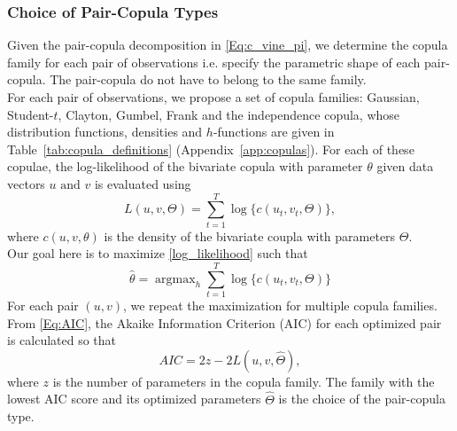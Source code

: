\documentclass[12pt,oneside,a4paper]{book}
\theoremstyle{definition}
\theoremstyle{remark}
\DeclareMathOperator*{\argmax}{argmax}
\begin{document}
				\subsubsection{Choice of Pair-Copula Types}
				Given the pair-copula decomposition in \ref{Eq:c_vine_pi}, we determine the copula family for each pair of observations i.e. specify the parametric shape of each pair-copula. The pair-copula do not have to belong to the same family.\\
				For each pair of observations, we propose a set of copula families: Gaussian, Student-$t$, Clayton, Gumbel, Frank and the independence copula, whose distribution functions, densities and $h$-functions are given in Table~\ref{tab:copula_definitions} (Appendix~\ref{app:copulas}). For each of these copulae, the log-likelihood of the bivariate copula with parameter $\theta$ given data vectors $u \text{ and } v$ is evaluated using
				\begin{equation}\label{log_likelihood}
					L\left(u, v,\Theta \right) = \sum_{t=1}^{T} \log \{c\left( u_t, v_t, \Theta \right)\},
				\end{equation}
				where $c\left(u,v,\theta \right)$ is the density of the bivariate coupla with parameters $\Theta$.\\
				Our goal here is to maximize \ref{log_likelihood} such that
				\begin{equation}
					\hat{\theta} = \argmax_{h} \sum_{t=1}^{T} \log \{c \left(u_t,v_t,\Theta \right) \}
				\end{equation}
				For each pair $\left(u,v\right)$, we repeat the maximization for multiple copula families. From \ref{Eq:AIC}, the Akaike Information Criterion (AIC) for each optimized pair is calculated so that
				\begin{equation}
					AIC = 2z - 2L\left(u,v, \hat{\Theta}\right),
				\end{equation}
				where $z$ is the number of parameters in the copula family.
				The family with the lowest AIC score and its optimized parameters $\hat{\Theta}$ is the choice of the pair-copula type.
\end{document}
